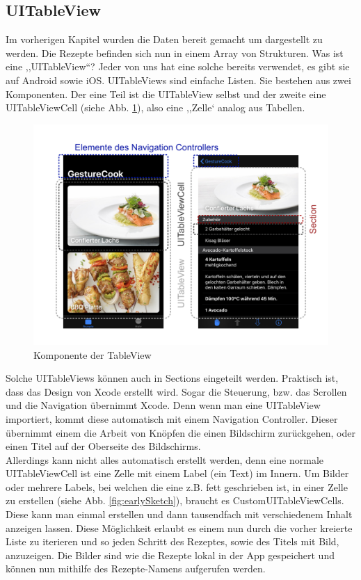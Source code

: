 \documentclass[12pt]{article}
\begin{document}
\subsection{UITableView}
Im vorherigen Kapitel wurden die Daten bereit gemacht um dargestellt zu werden. Die Rezepte befinden sich nun in einem Array von Strukturen. Was ist eine ,,UITableView``? Jeder von uns hat eine solche bereits verwendet, es gibt sie auf Android sowie iOS. UITableViews sind einfache Listen. Sie bestehen aus zwei Komponenten. Der eine Teil ist die UITableView selbst und der zweite eine UITableViewCell (siehe Abb. \ref{fig:TableView}), also eine ,,Zelle` analog aus Tabellen. 
\begin{figure}
    \includegraphics[width=\linewidth]{pictures/TableView.jpg}
    \caption{Komponente der TableView}
    \label{fig:TableView}
\end{figure}
Solche UITableViews können auch in Sections eingeteilt werden. Praktisch ist, dass das Design von Xcode erstellt wird. Sogar die Steuerung, bzw. das Scrollen und die Navigation übernimmt Xcode. Denn wenn man eine UITableView importiert, kommt diese automatisch mit einem Navigation Controller. Dieser übernimmt einem die Arbeit von Knöpfen die einen Bildschirm zurückgehen, oder einen Titel auf der Oberseite des Bildschirms. \\ Allerdings kann nicht alles automatisch erstellt werden, denn eine normale UITableViewCell ist eine Zelle mit einem Label (ein Text) im Innern. Um Bilder oder mehrere Labels, bei welchen die eine z.B. fett geschrieben ist, in einer Zelle zu erstellen (siehe Abb.  \ref{fig:earlySketch}), braucht es CustomUITableViewCells. Diese kann man einmal erstellen und dann tausendfach mit verschiedenem Inhalt anzeigen lassen. Diese Möglichkeit erlaubt es einem nun durch die vorher kreierte Liste zu iterieren und so jeden Schritt des Rezeptes, sowie des Titels mit Bild, anzuzeigen. Die Bilder sind wie die Rezepte lokal in der App gespeichert und können nun mithilfe des Rezepte-Namens aufgerufen werden. \cite{tableviewvideo,tableViewApple}
\end{document}
